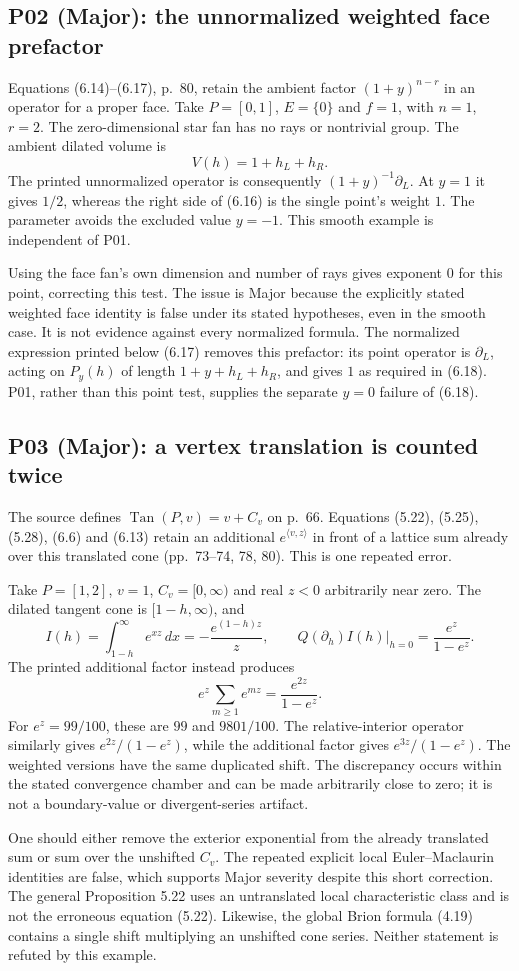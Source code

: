 \documentclass[10pt]{article}
\begin{document}
\subsection*{P02 (Major): the unnormalized weighted face prefactor}
Equations (6.14)–(6.17), p. 80, retain the ambient factor \((1+y)^{n-r}\) in an operator for a proper face. Take \(P=[0,1]\), \(E=\{0\}\) and \(f=1\), with \(n=1\), \(r=2\). The zero-dimensional star fan has no rays or nontrivial group. The ambient dilated volume is \[V(h)=1+h_L+h_R.\] The printed unnormalized operator is consequently \((1+y)^{-1}\partial_L\). At \(y=1\) it gives \(1/2\), whereas the right side of (6.16) is the single point’s weight \(1\). The parameter avoids the excluded value \(y=-1\). This smooth example is independent of P01.\par
Using the face fan’s own dimension and number of rays gives exponent \(0\) for this point, correcting this test. The issue is Major because the explicitly stated weighted face identity is false under its stated hypotheses, even in the smooth case. It is not evidence against every normalized formula. The normalized expression printed below (6.17) removes this prefactor: its point operator is \(\partial_L\), acting on \(P_y(h)\) of length \(1+y+h_L+h_R\), and gives \(1\) as required in (6.18). P01, rather than this point test, supplies the separate \(y=0\) failure of (6.18).\par
\subsection*{P03 (Major): a vertex translation is counted twice}
The source defines \(\operatorname{Tan}(P,v)=v+C_v\) on p. 66. Equations (5.22), (5.25), (5.28), (6.6) and (6.13) retain an additional \(e^{\langle v,z\rangle}\) in front of a lattice sum already over this translated cone (pp. 73–74, 78, 80). This is one repeated error.\par
Take \(P=[1,2]\), \(v=1\), \(C_v=[0,\infty)\) and real \(z<0\) arbitrarily near zero. The dilated tangent cone is \([1-h,\infty)\), and \[I(h)=\int_{1-h}^{\infty}e^{xz}\,dx
      =-\frac{e^{(1-h)z}}{z},\qquad
 \left.Q(\partial_h)I(h)\right|_{h=0}
      =\frac{e^z}{1-e^z}.\] The printed additional factor instead produces \[e^z\sum_{m\geq1}e^{mz}=\frac{e^{2z}}{1-e^z}.\] For \(e^z=99/100\), these are \(99\) and \(9801/100\). The relative-interior operator similarly gives \(e^{2z}/(1-e^z)\), while the additional factor gives \(e^{3z}/(1-e^z)\). The weighted versions have the same duplicated shift. The discrepancy occurs within the stated convergence chamber and can be made arbitrarily close to zero; it is not a boundary-value or divergent-series artifact.\par
One should either remove the exterior exponential from the already translated sum or sum over the unshifted \(C_v\). The repeated explicit local Euler–Maclaurin identities are false, which supports Major severity despite this short correction. The general Proposition 5.22 uses an untranslated local characteristic class and is not the erroneous equation (5.22). Likewise, the global Brion formula (4.19) contains a single shift multiplying an unshifted cone series. Neither statement is refuted by this example.\par
\end{document}
